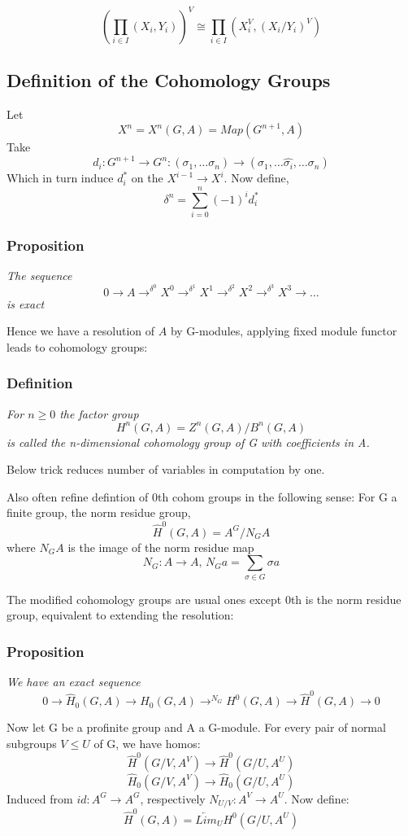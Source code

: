 $$(\prod_{i\in I} (X_i, Y_i))^V \cong \prod_{i\in I} (X_i^V, (X_i/Y_i)^V)$$




\subsection{Definition of the Cohomology Groups}
Let $$X^n = X^n (G,A) = Map(G^{n+1},A)$$
Take $$d_i:G^{n+1}\rightarrow G^n: (\sigma_1,\dots \sigma_n)\rightarrow (\sigma_1,\dots \hat{\sigma_i},\dots  \sigma_n)$$
Which in turn induce $d_i^*$ on the $X^{i-1}\rightarrow X^i$. Now define, $$\delta^n = \sum_{i=0}^n (-1)^i d_i^*$$

\subsubsection{Proposition}
\emph{The sequence
$$0\rightarrow A\rightarrow^{\delta^0} X^0\rightarrow^{\delta^1}X^1\rightarrow^{\delta^2}X^2\rightarrow^{\delta^3}X^3\rightarrow\dots$$ is exact}

Hence we have a resolution of $A$ by G-modules, applying fixed module functor leads to cohomology groups:

\subsubsection{Definition}
\emph{For $n\geq 0$ the factor group
$$H^n(G,A) = Z^n(G,A) / B^n(G,A)$$ is called the n-dimensional cohomology group of G with coefficients in A.}

Below trick reduces number of variables in computation by one.

Also often refine defintion of 0th cohom groups in the following sense:
For G a finite group, the norm residue group,
$$\hat H^0 (G,A) = A^G / N_G A$$ where $N_G A$ is the image of the norm residue map $$N_G:A\rightarrow A, \, N_G a = \sum_{\sigma\in G} \sigma a$$

The modified cohomology groups are usual ones except 0th is the norm residue group, equivalent to extending the resolution:

\subsubsection{Proposition}
\emph{We have an exact sequence
$$0\rightarrow \hat H_0(G,A)\rightarrow H_0(G,A)\rightarrow^{N_G}H^0(G,A)\rightarrow \hat H^0 (G,A)\rightarrow 0$$}

Now let G be a profinite group and A a G-module. For every pair of normal subgroups $V\leq U$ of G, we have homos:
$$\hat H^0(G/V,A^V)\rightarrow \hat H^0(G/U,A^U)$$
$$\hat H_0(G/V,A^V)\rightarrow \hat H_0(G/U,A^U)$$
Induced from $id:A^G\rightarrow A^G$, respectively $N_{U/V}:A^V\rightarrow A^U$.
Now define:
$$\hat H^0(G,A) = \underleftarrow{Lim}_U H^0 (G/U, A^U)$$

